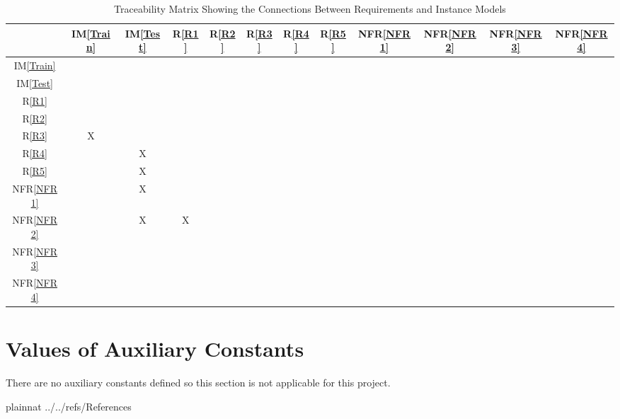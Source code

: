 \documentclass[12pt]{article}
\newcommand{\iref}[1]{IM\ref{#1}}
\newcommand{\rref}[1]{R\ref{#1}}
\newcommand{\nfrref}[1]{NFR\ref{#1}}
\begin{document}
\begin{table}[h!]
\centering
\begin{tabular}{|c|c|c|c|c|c|c|c|c|c|c|c|}
\hline
	& \iref{Train}& \iref{Test}& \rref{R1}& \rref{R2}& \rref{R3}& \rref{R4}& \rref{R5} & \nfrref{NFR1} & \nfrref{NFR2} & \nfrref{NFR3} & \nfrref{NFR4} \\
\hline
\iref{Train}    & & & & & & & & & & &  \\ \hline
\iref{Test}     & & & & & & & & & & &  \\ \hline
\rref{R1}       & & & & & & & & & & & \\ \hline
\rref{R2}       & & & & & & & & & & & \\ \hline
\rref{R3}       &X& & & & & & & & & &\\ \hline
\rref{R4}       & &X& & & & & & & & &\\ \hline
\rref{R5}       & &X& & & & & & & & &\\ \hline
\nfrref{NFR1}   & &X& & & & & & & & & \\ \hline
\nfrref{NFR2}   & &X&X& & & & & & & &\\ \hline 
\nfrref{NFR3}   & & & & & & & & & & &\\ \hline
\nfrref{NFR4}   & & & & & & & & & & &\\ 
\hline
\end{tabular}
\caption{Traceability Matrix Showing the Connections Between Requirements and Instance Models}
\label{Table:R_trace}
\end{table}

\section{Values of Auxiliary Constants}
There are no auxiliary constants defined so this section is not applicable for this project.

\newpage

 {plainnat}
 {../../refs/References}
\end{document}

